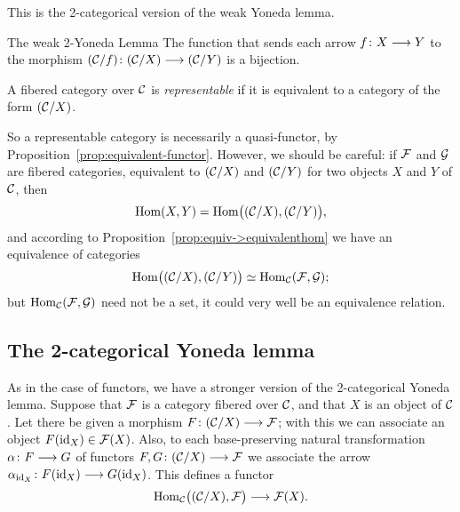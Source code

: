 \begin{3   FIBERED CATEGORIES}
\begin{3.6 Objects as fibcats and the 2-Yoneda}
This is the 2-categorical version of the weak Yoneda lemma.

\begin{named}{The weak 2-Yoneda Lemma}
The function that sends each arrow $f \colon X \arr Y$ to the morphism $(\cC/f) \colon (\cC/X) \arr (\cC/Y)$ is a bijection.
\end{named}

\begin{definition}
A fibered category over $\mathcal{C}$ is \emph{representable} if it is equivalent to a category of the form $(\mathcal{C}/X)$.
\end{definition}

So a representable category is necessarily a quasi-functor, by Proposition~\ref{prop:equivalent-functor}. However, we should be careful: if $\mathcal{F}$ and $\mathcal{G}$ are fibered categories, equivalent to $(\mathcal{C}/X)$ and $(\mathcal{C}/Y)$ for two objects $X$ and $Y$ of $\mathcal{C}$, then
   \[
   \operatorname{Hom}(X, Y) = \operatorname{Hom}\bigl( (\mathcal{C}/X),
   (\mathcal{C}/Y)\bigr),
   \]
and according to Proposition~\ref{prop:equiv->equivalenthom} we have an equivalence of categories
   \[
   \operatorname{Hom}\bigl( (\mathcal{C}/X), (\mathcal{C}/Y)\bigr)
   \simeq \operatorname{Hom}_{\mathcal{C}}(\mathcal{F}, \mathcal{G});
   \]
but $\operatorname{Hom}_{\mathcal{C}}(\mathcal{F}, \mathcal{G})$ need not be a set, it could very well be an equivalence relation.



\subsection{The 2-categorical Yoneda lemma}

As in the case of functors, we have a stronger version of the 2-categorical Yoneda lemma. Suppose that $\mathcal{F}$ is a category fibered over $\mathcal{C}$, and that $X$ is an object of $\mathcal{C}$. Let there be given a morphism $F \colon (\cC/X) \arr \cF$; with this we can associate an object $F(\mathrm{id}_X) \in \mathcal{F}(X)$. Also, to each base-preserving natural transformation $\alpha\colon F \arr G$ of functors $F, G \colon (\cC/X) \arr \cF$ we associate the arrow $\alpha_{\id_X} \colon F(\id_X) \arr G(\id_X)$. This defines a functor
   \[
   \hom_{\cC}\bigl((\cC/X), \cF\bigr)
   \arr \cF(X).
   \]


\end{3.6 Objects as fibcats and the 2-Yoneda}
\end{3   FIBERED CATEGORIES}
